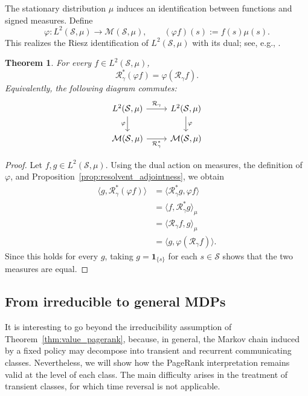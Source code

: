 \documentclass[letterpaper, 10 pt, conference]{ieeeconf}
\renewcommand{\S}{\mathcal{S}}
\newtheorem{theorem}{Theorem}
\begin{document}
The stationary distribution $\mu$ induces an
identification between functions and signed measures.
Define
\[
\varphi:L^2(\S,\mu)\to\mathcal M(\S,\mu),
\qquad
(\varphi f)(s):=f(s)\mu(s).
\]
This realizes the Riesz identification of $L^2(\S,\mu)$ with its dual;
see, e.g., \cite[Chapter~4]{rudin1991functional}.

\begin{theorem}
\label{thm:resolvent_conjugacy}
For every $f\in L^2(\S,\mu)$,
\[
\mathcal R_\gamma^*(\varphi f)
=
\varphi(\mathcal R_\gamma f).
\]
Equivalently, the following diagram commutes:
\[
\begin{tikzcd}
L^2(\S,\mu)
    \arrow[r, "\mathcal R_\gamma"]
    \arrow[d, "\varphi"']
&
L^2(\S,\mu)
    \arrow[d, "\varphi"]
\\
\mathcal M(\S,\mu)
    \arrow[r, "\mathcal R_\gamma^*"']
&
\mathcal M(\S,\mu)
\end{tikzcd}
\]
\end{theorem}

\begin{proof}
Let $f,g\in L^2(\S,\mu)$. Using the dual action on
measures, the definition of $\varphi$, and
Proposition~\ref{prop:resolvent_adjointness}, we obtain
\[
\begin{aligned}
\langle g,\mathcal R_\gamma^*(\varphi f)\rangle
&=\langle\mathcal R_\gamma^*g,\varphi f\rangle\\
&=\langle f,\mathcal R_\gamma^*g\rangle_\mu\\
&=\langle\mathcal R_\gamma f,g\rangle_\mu\\
&=\langle g,\varphi(\mathcal R_\gamma f)\rangle.
\end{aligned}
\]
Since this holds for every $g$, taking
$g=\mathbf 1_{\{s\}}$ for each $s\in\S$ shows
that the two measures are equal.
\end{proof}


\subsection{From irreducible to general MDPs}

It is interesting to go beyond the irreducibility assumption of Theorem~\ref{thm:value_pagerank}, because, in general, the Markov chain induced by a fixed policy may decompose into transient and recurrent communicating classes.
Nevertheless, we will show how the PageRank interpretation remains valid at the level of each class. The main difficulty arises in the treatment of transient classes, for which time reversal is not applicable. 
\end{document}
